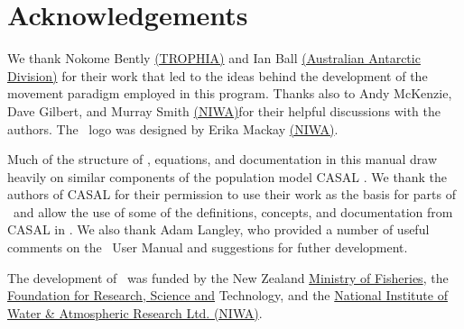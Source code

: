 \section{Acknowledgements\label{sec:acknowledgements}}

We thank Nokome Bently \href{http://www.trophia.co.nz}{(TROPHIA)} and Ian Ball \href{http://www.aad.gov.au}{(Australian Antarctic Division)} for their work that led to the ideas behind the development of the movement paradigm employed in this  program. Thanks also to Andy McKenzie, Dave Gilbert, and Murray Smith \href{http://www.niwa.co.nz}{(NIWA)}for their helpful discussions with the authors. The \SPM\ logo was designed by Erika Mackay \href{http://www.niwa.co.nz}{(NIWA)}. 

Much of the structure of \SPM, equations, and documentation in this manual draw heavily on similar components of the population model CASAL \citep{1388}. We thank the authors of CASAL for their permission to use their work as the basis for parts of \SPM\ and allow the use of some of the definitions, concepts, and documentation from CASAL in \SPM.  We also thank Adam Langley, who provided a number of useful comments on the \SPM\ User Manual and suggestions for futher development.

The development of \SPM\ was funded by the New Zealand \href{http://www.fish.govt.nz}{Ministry of Fisheries}, the \href{http://www.frst.govt.nz}{Foundation for Research, Science and} Technology, and the \href{http://www.niwa.co.nz}{National Institute of Water \& Atmospheric Research Ltd. (NIWA)}. 
